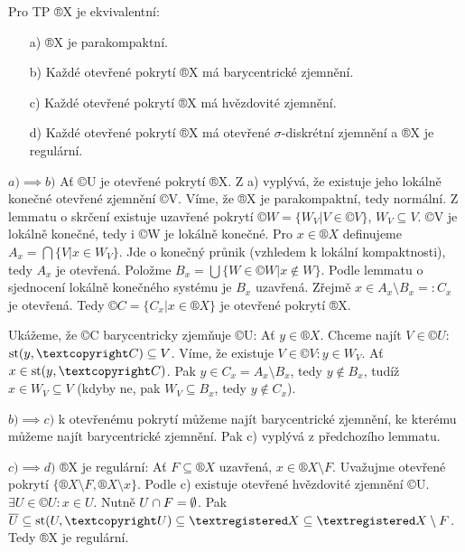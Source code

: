 \documentclass[12pt]{article}                   %
\begin{document}
    \begin{veta}
        Pro TP ®X je ekvivalentní:

        \begin{itemize}
            \item[a)] ®X je parakompaktní.
            \item[b)] Každé otevřené pokrytí ®X má barycentrické zjemnění.
            \item[c)] Každé otevřené pokrytí ®X má hvězdovité zjemnění.
            \item[d)] Každé otevřené pokrytí ®X má otevřené $\sigma$-diskrétní zjemnění a ®X je regulární.
        \end{itemize}

        \begin{dukazin}
            $a) \implies b)$ Ať ©U je otevřené pokrytí ®X. Z a) vyplývá, že existuje jeho lokálně konečné otevřené zjemnění ©V. Víme, že ®X je parakompaktní, tedy normální. Z lemmatu o skrčení existuje uzavřené pokrytí $©W = \{W_V | V \in ©V\}$, $W_V \subseteq V$. ©V je lokálně konečné, tedy i ©W je lokálně konečné. Pro $x \in ®X$ definujeme $A_x = \bigcap\{V | x \in W_V\}$. Jde o konečný průnik (vzhledem k lokální kompaktnosti), tedy $A_x$ je otevřená. Položme $B_x = \bigcup\{W \in ©W | x \notin W\}$. Podle lemmatu o sjednocení lokálně konečného systému je $B_x$ uzavřená. Zřejmě $x \in A_x \setminus B_x =: C_x$ je otevřená. Tedy $©C = \{C_x|x \in ®X\}$ je otevřené pokrytí ®X.

                Ukážeme, že ©C barycentricky zjemňuje ©U: Ať $y \in ®X$. Chceme najít $V \in ©U$: $\st(y, ©C) \subseteq V$. Víme, že existuje $V \in ©V: y \in W_V$. Ať $x \in \st(y, ©C)$. Pak $y \in C_x = A_x \setminus B_x$, tedy $y \notin B_x$, tudíž $x \in W_V \subseteq V$ (kdyby ne, pak $W_V \subseteq B_x$, tedy $y \notin C_x$).

            $b) \implies c)$ k otevřenému pokrytí můžeme najít barycentrické zjemnění, ke kterému můžeme najít barycentrické zjemnění. Pak c) vyplývá z předchozího lemmatu.

            $c) \implies d)$ ®X je regulární: Ať $F \subseteq ®X$ uzavřená, $x \in ®X \setminus F$. Uvažujme otevřené pokrytí $\{®X \setminus F, ®X \setminus {x}\}$. Podle c) existuje otevřené hvězdovité zjemnění ©U. $\exists U \in ©U: x \in U$. Nutně $U \cap F = \emptyset$. Pak $\overline{U} \subseteq \st(U, ©U) \subseteq ®X \subseteq ®X \setminus F$. Tedy ®X je regulární.


\end{dukazin}
\end{veta}
\end{document}
